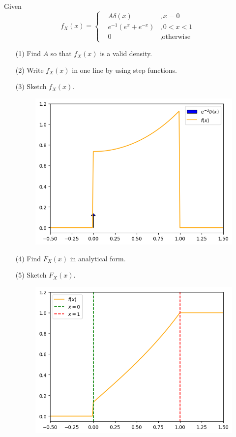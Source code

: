 \noindent {}
Given 
\[ 
    f_X(x) = \left\{
    \begin{aligned}
        &A \delta(x) &, x = 0 \\
        &e^{-1} (e^x + e^{-x}) &, 0 < x < 1 \\
        &0 &, \text{otherwise}
    \end{aligned}
    \right.
\]
\begin{enumerate}
    \item[(1)] Find $A$ so that $f_X(x)$ is a valid density. \\
    \item[(2)] Write $f_X(x)$ in one line by using step functions. \\
    \item[(3)] Sketch $f_X(x)$. \\
    \begin{figure}[!h]
        \centering
        \includegraphics[width=0.5\linewidth]{HWs//HW2//figures/6-3.png}
    \end{figure}
    \item[(4)] Find $F_X(x)$ in analytical form. \\
    \myAnswer{
    \[
        F_X(x) = \left\{
            \begin{aligned}
            &0 &, x < 0 \\
            &e^{-2} + e^{-1}(e^x - e^{-x}) &, 0 \leq x < 1 \\
            &1 &, x \geq 1
        \end{aligned}
    \right.
    \]
    }
    \newpage
    \item[(5)] Sketch $F_X(x)$. \\
    \begin{figure}[!h]
        \centering
        \includegraphics[width=0.5\linewidth]{HWs//HW2//figures/6-5.png}
    \end{figure}
\end{enumerate}